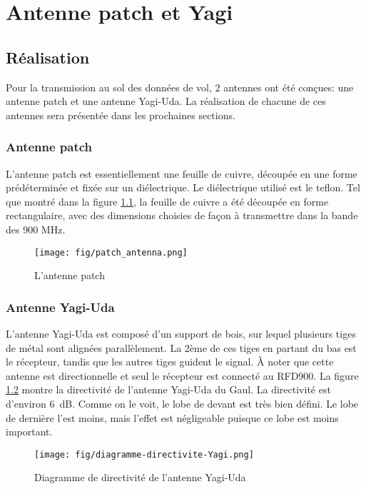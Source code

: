 \chapter{Antenne patch et Yagi}
\label{chap:antennes}

\section{Réalisation}

Pour la transmission au sol des données de vol, 2 antennes ont été conçues: une
antenne patch et une antenne Yagi-Uda. La réalisation de chacune de ces
antennes sera présentée dans les prochaines sections.

\subsection{Antenne patch}

L'antenne patch est essentiellement une feuille de cuivre, découpée en une
forme prédéterminée et fixée sur un diélectrique. Le diélectrique utilisé est
le teflon. Tel que montré dans la figure \ref{f:antenne_patch}, la feuille de
cuivre a été découpée en forme rectangulaire, avec des dimensions choisies de
façon à transmettre dans la bande des 900 MHz.

\begin{figure}[H]
	\center
	\texttt{[image: fig/patch\_antenna.png]}
	\caption{L'antenne patch}
	\label{f:antenne_patch}
\end{figure}

\subsection{Antenne Yagi-Uda}

L'antenne Yagi-Uda est composé d'un support de bois, sur lequel plusieurs tiges
de métal sont alignées parallèlement. La 2ème de ces tiges en partant du bas
est le récepteur, tandis que les autres tiges guident le signal. À noter que
cette antenne est directionnelle et seul le récepteur est connecté au RFD900.
La figure \ref{f:diagramme_directivite_yagi} montre la directivité de l'antenne
Yagi-Uda du Gaul. La directivité est d'environ 6~dB. Comme on le voit, le lobe
de devant est très bien défini. Le lobe de dernière l'est moins, mais l'effet
est négligeable puisque ce lobe est moins important.

\begin{figure}[H]
	\center
	\texttt{[image: fig/diagramme-directivite-Yagi.png]}
	\caption{Diagramme de directivité de l'antenne Yagi-Uda}
	\label{f:diagramme_directivite_yagi}
\end{figure}

